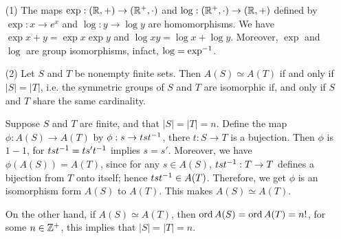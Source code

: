 \begin{example}\label{example_1.12}
  \begin{enumerate}
    \item[(1)] The maps $\exp: (\mathbb{R},+) \rightarrow (\mathbb{R}^+, \cdot)$ and
      $\log: (\mathbb{R}^+, \cdot) \rightarrow (\mathbb{R},+)$ defined by $\exp:x
      \rightarrow e^x$ and $\log:y \rightarrow \log{y}$ are homomorphisms.
      We have $\exp{x+y}=\exp{x}\exp{y}$ and $\log{xy}=\log{x}+\log{y}$.
      Moreover, $\exp$ and  $\log$ are group isomorphisms, infact,
      $\log=\exp^{-1}$.

    \item[(2)] Let $S$ and  $T$ be nonempty finite sets. Then  $A(S) \simeq
      A(T)$ if and only if $|S|=|T|$, i.e. the symmetric groups of  $S$
      and  $T$ are isomorphic if, and only if  $S$ and  $T$ share the same
      cardinality.

      Suppose $S$ and  $T$ are finite, and that  $|S|=|T|=n$. Define  the
      map  $\phi:A(S) \rightarrow A(T)$ by $\phi:s \rightarrow tst^{-1}$,
      there $t:S \rightarrow T$ is a bujection. Then $\phi$ is $1-1$, for
      $tst^{-1}=ts't^{-1}$ implies $s=s'$. Moreover, we have
      $\phi(A(S))=A(T)$, since for any $s \in A(S)$, $tst^{-1}:T
      \rightarrow T$ defines a bijection from $T$ onto itself; hence
      $tst^{-1} \in A(T)$. Therefore, we get $\phi$ is an isomorphism
      form  $A(S)$ to $A(T)$. This makes $A(S) \simeq A(T)$.

      On the other hand, if  $A(S) \simeq A(T)$, then $\operatorname{ord}{A(S)}=
      \operatorname{ord}{A(T)}=n!$, for some $n \in \mathbb{Z}^+$, this implies that
      $|S|=|T|=n$.
  \end{enumerate}
\end{example}

